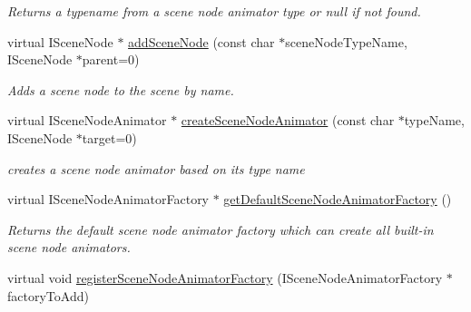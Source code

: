 \begin{DoxyCompactItemize}
\begin{DoxyCompactList}\small\item\em Returns a typename from a scene node animator type or null if not found. \end{DoxyCompactList}\item 
\hypertarget{classirr_1_1scene_1_1_c_scene_manager_a6b4763e84a7a7390326b16d8374dabf7}{virtual I\-Scene\-Node $\ast$ \hyperlink{classirr_1_1scene_1_1_c_scene_manager_a6b4763e84a7a7390326b16d8374dabf7}{add\-Scene\-Node} (const char $\ast$scene\-Node\-Type\-Name, I\-Scene\-Node $\ast$parent=0)}\label{classirr_1_1scene_1_1_c_scene_manager_a6b4763e84a7a7390326b16d8374dabf7}

\begin{DoxyCompactList}\small\item\em Adds a scene node to the scene by name. \end{DoxyCompactList}\item 
\hypertarget{classirr_1_1scene_1_1_c_scene_manager_a7851ed5053cb35e80a7c8ed264f38ad7}{virtual I\-Scene\-Node\-Animator $\ast$ \hyperlink{classirr_1_1scene_1_1_c_scene_manager_a7851ed5053cb35e80a7c8ed264f38ad7}{create\-Scene\-Node\-Animator} (const char $\ast$type\-Name, I\-Scene\-Node $\ast$target=0)}\label{classirr_1_1scene_1_1_c_scene_manager_a7851ed5053cb35e80a7c8ed264f38ad7}

\begin{DoxyCompactList}\small\item\em creates a scene node animator based on its type name \end{DoxyCompactList}\item 
\hypertarget{classirr_1_1scene_1_1_c_scene_manager_a986ba72b82f39be28adcfa1f0097bf59}{virtual I\-Scene\-Node\-Animator\-Factory $\ast$ \hyperlink{classirr_1_1scene_1_1_c_scene_manager_a986ba72b82f39be28adcfa1f0097bf59}{get\-Default\-Scene\-Node\-Animator\-Factory} ()}\label{classirr_1_1scene_1_1_c_scene_manager_a986ba72b82f39be28adcfa1f0097bf59}

\begin{DoxyCompactList}\small\item\em Returns the default scene node animator factory which can create all built-\/in scene node animators. \end{DoxyCompactList}\item 
\hypertarget{classirr_1_1scene_1_1_c_scene_manager_ae655cbcd0d85cc1a6c03278f6e2c4153}{virtual void \hyperlink{classirr_1_1scene_1_1_c_scene_manager_ae655cbcd0d85cc1a6c03278f6e2c4153}{register\-Scene\-Node\-Animator\-Factory} (I\-Scene\-Node\-Animator\-Factory $\ast$factory\-To\-Add)}\label{classirr_1_1scene_1_1_c_scene_manager_ae655cbcd0d85cc1a6c03278f6e2c4153}


\end{DoxyCompactItemize}
